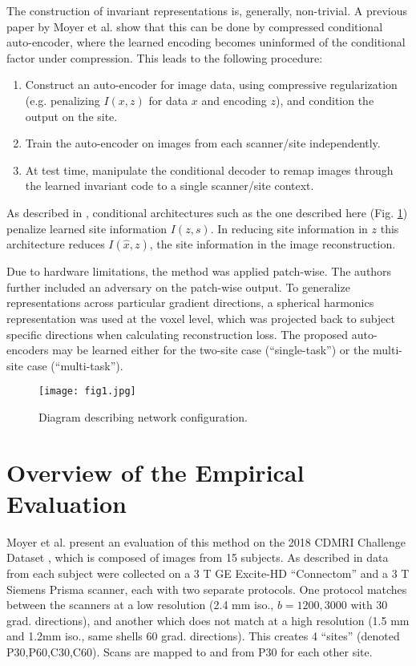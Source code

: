 \documentclass{midl} %
\begin{document}
The construction of invariant representations is, generally, non-trivial. A previous paper by Moyer et al. \cite{NIPS2018_8122} show that this can be done by compressed conditional auto-encoder, where the learned encoding becomes uninformed of the conditional factor under compression. This leads to the following procedure:
\begin{enumerate}
\item Construct an auto-encoder for image data, using compressive regularization (e.g. penalizing $I(x,z)$ for data $x$ and encoding $z$), and condition the output on the site.
\item Train the auto-encoder on images from each scanner/site independently.
\item At test time, manipulate the conditional decoder to remap images through the learned invariant code to a single scanner/site context.
\end{enumerate}
As described in \cite{NIPS2018_8122}, conditional architectures such as the one described here (Fig. \ref{fig:diagram}) penalize learned site information $I(z,s)$. In reducing site information in $z$ this architecture reduces $I(\hat{x},z)$, the site information in the image reconstruction.

Due to hardware limitations, the method was applied patch-wise. The authors further included an adversary on the patch-wise output. To generalize representations across particular gradient directions, a spherical harmonics representation was used at the voxel level, which was projected back to subject specific directions when calculating reconstruction loss. The proposed auto-encoders may be learned either for the two-site case (``single-task'') or the multi-site case (``multi-task'').

\begin{figure}[t!]
\centering
\texttt{[image: fig1.jpg]}
\caption{Diagram describing network configuration.}
\label{fig:diagram}
\end{figure}

\section{Overview of the Empirical Evaluation}

Moyer et al. \cite{moyer2019scanner} present an evaluation of this method on the 2018 CDMRI Challenge Dataset \cite{ning2018muti,tax2019cross,taxcross}, which is composed of images from 15 subjects. As described in \cite{ning2018muti} data from each subject were collected on a 3 T GE Excite-HD ``Connectom'' and a 3 T Siemens Prisma scanner, each with two separate protocols. One protocol matches between the scanners at a low resolution (2.4 mm iso., $b={1200,3000}$ with 30 grad. directions), and another which does not match at a high resolution (1.5 mm and 1.2mm iso., same shells 60 grad. directions). This creates 4 ``sites'' (denoted P30,P60,C30,C60). Scans are mapped to and from P30 for each other site.
\end{document}

